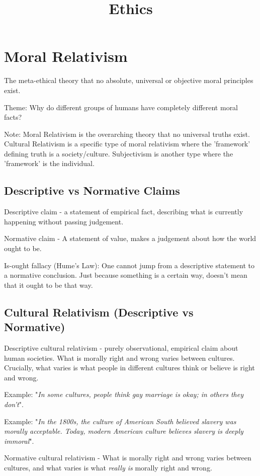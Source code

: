 \documentclass[12pt]{article}
\title{Ethics}
\date{}
\author{}
\begin{document}
\section{Moral Relativism}
The meta-ethical theory that no absolute, universal or objective moral principles exist.

\noindent Theme: Why do different groups of humans have completely different moral facts?

\vspace{1em}
\noindent Note: Moral Relativism is the overarching theory that no universal truths exist. Cultural Relativism is a specific type of moral relativism where the 'framework' defining truth is a society/culture.
Subjectivism is another type where the 'framework' is the individual.

\subsection{Descriptive vs Normative Claims}
Descriptive claim - a statement of empirical fact, describing what is currently happening without passing judgement.

\noindent Normative claim - A statement of value, makes a judgement about how the world ought to be.

\noindent Is-ought fallacy (Hume's Law): One cannot jump from a descriptive statement to a normative conclusion.
Just because something is a certain way, doesn't mean that it ought to be that way.

\subsection{Cultural Relativism (Descriptive vs Normative)}
Descriptive cultural relativism - purely observational, empirical claim about human societies. What is morally right and wrong
varies between cultures. Crucially, what varies is what people in different cultures think or believe is right and wrong.

\noindent Example: "\textit{In some cultures, people think gay marriage is okay; in others they don't}".

\noindent Example: "\textit{In the 1800s, the culture of American South believed slavery was morally acceptable. Today, modern American culture believes slavery is deeply immoral}".

Normative cultural relativism - What is morally right and wrong varies between cultures, 
and what varies is what \textit{really is} morally right and wrong.
\end{document}
